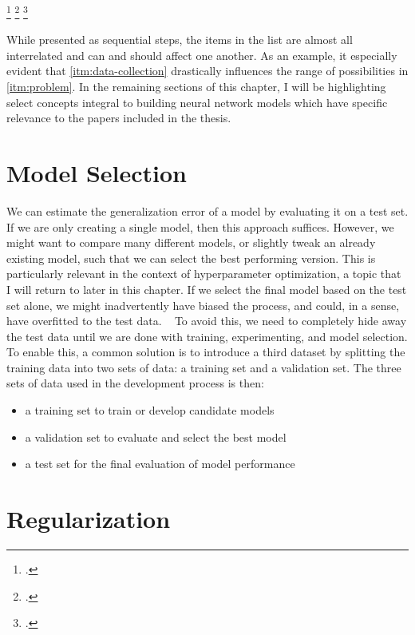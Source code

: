 \footcitetext{lecunHandwritten1989}
\footcitetext{cholletDeep2021}
\footcitetext{goodfellow2016deep}

While presented as sequential steps, 
the items in the list are almost all interrelated 
and can and should affect one another. 
As an example, 
it especially evident that
\cref{itm:data-collection} 
drastically influences the range of possibilities in 
\cref{itm:problem}.
In the remaining sections of this chapter, 
I will be highlighting select concepts integral to  
building neural network models which have specific
relevance to the papers included in the thesis.

\section{Model Selection}
\label{sec:model-selection}

We can estimate the generalization error of a model
by evaluating it on a test set.
If we are only creating a single model,
then this approach suffices. 
However, we might want to compare many different models,
or slightly tweak an already existing model,
such that we can select the best performing version.
This is particularly relevant in the context of hyperparameter optimization,
a topic that I will return to later in this chapter.
If we select the final model based on the test set alone,
we might inadvertently have biased the process,
and could, in a sense, have overfitted to the test data.
~\autocite{murphyMachine2012}
To avoid this, we need to completely hide away the test data
until we are done with training, experimenting, 
and model selection.
To enable this, a common solution is to introduce a third dataset by splitting 
the training data into two sets of data: a training set and a validation set.
The three sets of data used in the development process is then: 
%
\begin{itemize}
    \item a training set to train or develop candidate models
    \item a validation set to evaluate and select the best model
    \item a test set for the final evaluation of model performance
\end{itemize}

\section{Regularization}
\label{sec:regularization}

